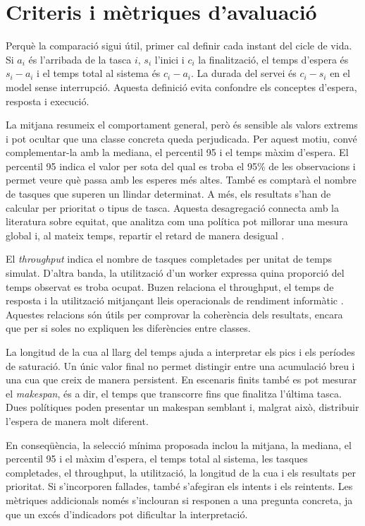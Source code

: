 \section{Criteris i mètriques d'avaluació}

Perquè la comparació sigui útil, primer cal definir cada instant del cicle de vida. Si
$a_i$ és l'arribada de la tasca $i$, $s_i$ l'inici i $c_i$ la finalització, el
temps d'espera és $s_i-a_i$ i el temps total al sistema és $c_i-a_i$. La durada
del servei és $c_i-s_i$ en el model sense interrupció. Aquesta definició evita
confondre els conceptes d'espera, resposta i execució.

La mitjana resumeix el comportament general, però és sensible als valors extrems
i pot ocultar que una classe concreta queda perjudicada. Per aquest motiu,
convé complementar-la amb la mediana, el percentil 95 i el temps màxim d'espera.
El percentil 95 indica el valor per sota del qual es troba el 95\% de les
observacions i permet veure què passa amb les esperes més altes. També es
comptarà el nombre de tasques que superen un llindar determinat. A més, els
resultats s'han de calcular per prioritat o tipus de tasca. Aquesta desagregació
connecta amb la literatura sobre equitat, que analitza com una política pot
millorar una mesura global i, al mateix temps, repartir el retard de manera
desigual \parencite{wierman2011fairness}.

El \emph{throughput} indica el nombre de tasques completades per unitat de temps
simulat. D'altra banda, la utilització d'un worker expressa quina proporció del temps
observat es troba ocupat. Buzen relaciona el throughput, el temps de resposta i
la utilització mitjançant lleis operacionals de rendiment informàtic
\parencite{buzen1976laws}. Aquestes relacions són útils per comprovar la
coherència dels resultats, encara que per si soles no expliquen les diferències
entre classes.

La longitud de la cua al llarg del temps ajuda a interpretar els pics i els
períodes de saturació. Un únic valor final no permet distingir entre una
acumulació breu i una cua que creix de manera persistent. En escenaris finits
també es pot mesurar el \emph{makespan}, és a dir, el temps que transcorre fins
que finalitza l'última tasca. Dues polítiques poden presentar un makespan
semblant i, malgrat això, distribuir l'espera de manera molt diferent.

En conseqüència, la selecció mínima proposada inclou la mitjana, la mediana, el
percentil 95 i el màxim d'espera, el temps total al sistema, les tasques
completades, el throughput, la utilització, la longitud de la cua i els
resultats per prioritat. Si s'incorporen fallades, també s'afegiran els intents
i els reintents. Les mètriques addicionals només s'inclouran si responen a una
pregunta concreta, ja que un excés d'indicadors pot dificultar la interpretació.

